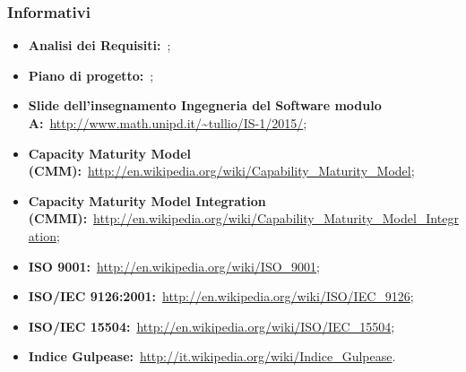 	\subsubsection{Informativi}
	\begin{itemize}
		\item \textbf{Analisi dei Requisiti:}\ \ARdoc;
		\item \textbf{Piano di progetto:}\ \PPdoc;
		\item \textbf{Slide dell’insegnamento Ingegneria del Software modulo A:}\ \url{http://www.math.unipd.it/~tullio/IS-1/2015/};
		\item \textbf{Capacity Maturity Model (CMM):}\ \url{http://en.wikipedia.org/wiki/Capability_Maturity_Model};
		\item \textbf{Capacity Maturity Model Integration (CMMI):}\ \url{http://en.wikipedia.org/wiki/Capability_Maturity_Model_Integration};
		\item \textbf{ISO 9001:}\ \url{http://en.wikipedia.org/wiki/ISO_9001};
		\item \textbf{ISO/IEC 9126:2001:}\ \url{http://en.wikipedia.org/wiki/ISO/IEC_9126};
		\item \textbf{ISO/IEC 15504:}\ \url{http://en.wikipedia.org/wiki/ISO/IEC_15504};
		\item \textbf{Indice Gulpease:}\ \url{http://it.wikipedia.org/wiki/Indice_Gulpease}.
	\end{itemize}
	


			
			